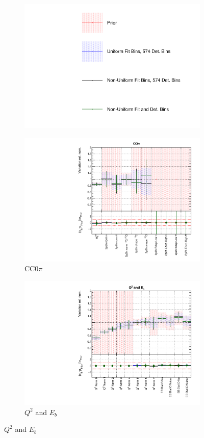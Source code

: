 \begin{figure}
\centering
\begin{subfigure}{0.95\textwidth}
  \centering
  \includegraphics[width=0.29\linewidth]{figs/polyasmvs_leg}
\end{subfigure}
\begin{subfigure}{0.49\textwidth}
  \centering
  \includegraphics[width=0.9\linewidth]{figs/polyasmvsxsec_1}
  \caption{CC0$\pi$}
\end{subfigure}
\begin{subfigure}{0.49\textwidth}
  \centering
  \includegraphics[width=0.9\linewidth]{figs/polyasmvsxsec_2}
  \caption{$Q^2$ and $E_b$}
\end{subfigure}

\end{figure}
